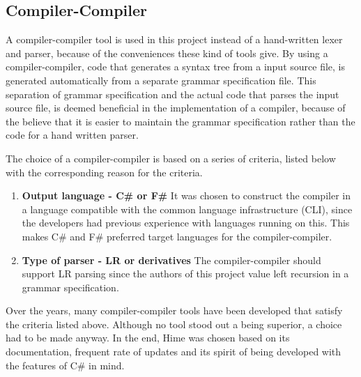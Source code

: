 \subsection{Compiler-Compiler}
\label{sec:compiler_compiler_choice}

A compiler-compiler tool is used in this project instead of a hand-written lexer and parser, because of the conveniences these kind of tools give. By using a compiler-compiler, code that generates a syntax tree from a input source file, is generated automatically from a separate grammar specification file. This separation of grammar specification and the actual code that parses the input source file, is deemed beneficial in the implementation of a compiler, because of the believe that it is easier to maintain the grammar specification rather than the code for a hand written parser.



The choice of a compiler-compiler is based on a series of criteria, listed below with the corresponding reason for the criteria.

\begin{enumerate}
\item \textbf{Output language - C\# or F\#} It was chosen to construct the compiler in a language compatible with the common language infrastructure (CLI), since the developers had previous experience with languages running on this. This makes C\# and F\# preferred target languages for the compiler-compiler.

\item \textbf{Type of parser - LR or derivatives} The compiler-compiler should support LR parsing since the authors of this project value left recursion in a grammar specification.\\

\end{enumerate}

Over the years, many compiler-compiler tools have been developed that satisfy the criteria listed above. Although no tool stood out a being superior, a choice had to be made anyway. In the end, Hime was chosen based on its documentation, frequent rate of updates and its spirit of being developed with the features of C\# in mind.

